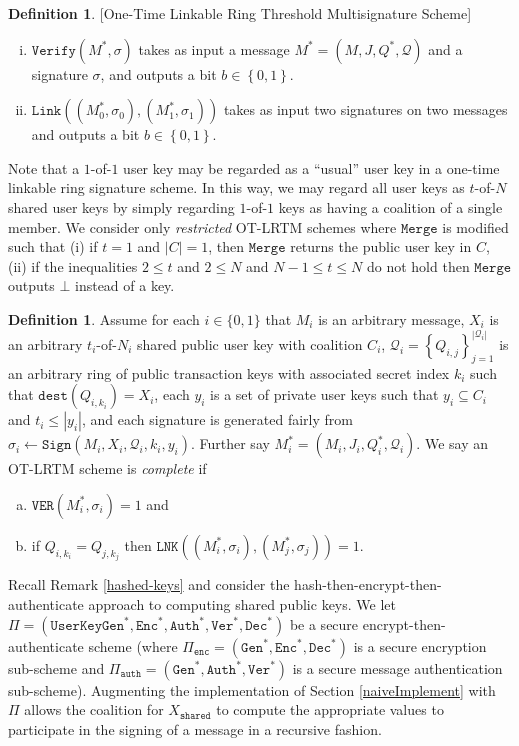 \documentclass{mrl}
\theoremstyle{definition}
\newtheorem{defn}[theorem]{Definition}
\begin{document}
\begin{defn}{[One-Time Linkable Ring Threshold Multisignature Scheme]}
\begin{enumerate}[(i)]
    \item $\texttt{Verify}(M^*,\sigma)$ takes as input a message $M^* = (M, J, Q^*, \mathcal{Q})$  and a signature $\sigma$, and outputs a bit $b \in \left\{0,1\right\}$. 
    
    \item $\texttt{Link}((M^*_0, \sigma_0), (M^*_1, \sigma_1))$ takes as input two signatures on two messages and outputs a bit $b \in \left\{0,1\right\}$.
\end{enumerate}
\end{defn}

 Note that a $1$-of-$1$ user key may be regarded as a ``usual'' user key in a one-time linkable ring signature scheme. In this way, we may regard all user keys as $t$-of-$N$ shared user keys by simply regarding $1$-of-$1$ keys as having a coalition of a single member. We consider only \textit{restricted} OT-LRTM schemes where $\texttt{Merge}$ is modified such that (i) if $t=1$ and $\left|C\right| = 1$, then $\texttt{Merge}$ returns the public user key in $C$, (ii) if the inequalities $2 \leq t$ and $2 \leq N$ and $N-1 \leq t \leq N$ do not hold then $\texttt{Merge}$ outputs $\bot$ instead of a key.

\begin{defn}
Assume for each $i \in \{0,1\}$ that $M_i$ is an arbitrary message, $X_i$ is an arbitrary $t_i$-of-$N_i$ shared public user key with coalition $C_i$, $\mathcal{Q}_i=\left\{Q_{i,j}\right\}_{j=1}^{\left|\mathcal{Q}_i\right|}$ is an arbitrary ring of public transaction keys with associated secret index $k_i$ such that $\texttt{dest}(Q_{i,k_i}) = X_i$, each $y_i$ is a set of private user keys such that $y_i \subseteq C_i$ and $t_i \leq \left|y_i\right|$, and each signature is generated fairly from $\sigma_i \leftarrow \texttt{Sign}(M_i,X_i,\mathcal{Q}_i,k_i,y_i)$. Further say $M^*_i = (M_i, J_i, Q^*_i, \mathcal{Q}_i)$. We say an OT-LRTM scheme is \textit{complete} if
\begin{enumerate}[(a)]
\item $\texttt{VER}(M^*_i,\sigma_i) = 1$ and
\item if $Q_{i,k_i} = Q_{j,k_j}$ then $\texttt{LNK}((M^*_i, \sigma_i), (M^*_j, \sigma_j))=1$.
\end{enumerate}
\end{defn}



Recall Remark \ref{hashed-keys} and consider the hash-then-encrypt-then-authenticate approach to computing shared public keys. We let $\Pi = (\texttt{UserKeyGen}^*,\texttt{Enc}^*, \texttt{Auth}^*, \texttt{Ver}^*, \texttt{Dec}^*)$ be a secure encrypt-then-authenticate scheme (where $\Pi_{\texttt{enc}} = (\texttt{Gen}^*,\texttt{Enc}^*, \texttt{Dec}^*)$ is a secure encryption sub-scheme and $\Pi_{\texttt{auth}} = (\texttt{Gen}^*,\texttt{Auth}^*, \texttt{Ver}^*)$ is a secure message authentication sub-scheme). Augmenting the implementation of Section \ref{naiveImplement} with $\Pi$ allows the coalition for $X_{\texttt{shared}}$ to compute the appropriate values to participate in the signing of a message in a recursive fashion. 
\end{document}
